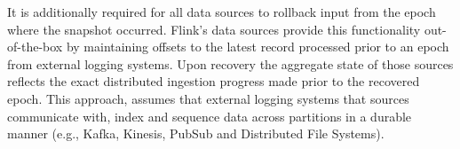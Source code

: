 It is additionally required for all data sources to rollback input from the epoch where the snapshot occurred. Flink's data sources provide this functionality out-of-the-box by maintaining offsets to the latest record processed prior to an epoch from external logging systems. Upon recovery the aggregate state of those sources reflects the exact distributed ingestion progress made prior to the recovered epoch. This approach, assumes that external logging systems that sources communicate with, index and sequence data across partitions in a durable manner (e.g., Kafka, Kinesis, PubSub and Distributed File Systems). 




